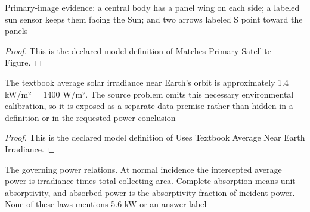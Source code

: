 \begin{definition}
  \label{def:physics:phyx-mini-0945:phyxminiproblems-problemphyxmini0945-matchesprimarysatellitefigure}
  Primary-image evidence: a central body has a panel wing on each side; a labeled sun sensor keeps them facing the Sun; and two arrows labeled S point toward the panels
\end{definition}
\begin{proof}
  This is the declared model definition of Matches Primary Satellite Figure.
\end{proof}
\begin{definition}
  \label{def:physics:phyx-mini-0945:phyxminiproblems-problemphyxmini0945-usestextbookaveragenearearthirradiance}
  The textbook average solar irradiance near Earth's orbit is approximately 1.4 kW/m² = 1400 W/m². The source problem omits this necessary environmental calibration, so it is exposed as a separate data premise rather than hidden in a definition or in the requested power conclusion
\end{definition}
\begin{proof}
  This is the declared model definition of Uses Textbook Average Near Earth Irradiance.
\end{proof}
\begin{definition}
  \label{def:physics:phyx-mini-0945:phyxminiproblems-problemphyxmini0945-satisfiessolarpanelpowerlaws}
  The governing power relations. At normal incidence the intercepted average power is irradiance times total collecting area. Complete absorption means unit absorptivity, and absorbed power is the absorptivity fraction of incident power. None of these laws mentions 5.6 kW or an answer label
\end{definition}
